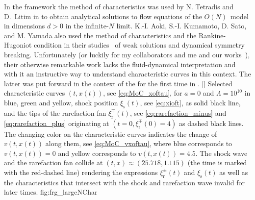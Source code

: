 In the \frg{} framework the method of characteristics was used by N. Tetradis and D.~Litim in  to obtain analytical solutions to \frg{} flow equations of the $O(N)$~model in dimensions $d > 0$ in the infinite-$N$ limit. 
K.-I. Aoki, S.-I. Kumamoto, D. Sato, and M. Yamada also used the method of characteristics and the Rankine-Hugoniot condition in their studies~\cite{Aoki:2014,Aoki:2017rjl} of weak solutions and dynamical symmetry breaking. 
Unfortunately (or luckily for my collaborators and me and our works~\cite{Grossi:2019urj,Grossi:2021ksl,Koenigstein:2021syz,Koenigstein:2021rxj,Steil:partIV,Stoll:2021ori}), their otherwise remarkable work lacks the fluid-dynamical interpretation and with it an instructive way to understand characteristic curves in this context.
The latter was put forward in the context of the \frg{} for the first time in .\bigskip
{}%
	[]%
	{%
{}%
		Selected characteristic curves $(t,x(t))$, see \cref{eq:MoC_xoftau}, for $a=0$ and $\Lambda=10^{10}$ in {blue}, {green} and {yellow}, shock position $\xi_\mathrm{s} ( t )$, see \cref{eq:xioft}, as solid black line, and the tips of the rarefaction fan $\xi_\mathrm{r}^\mp ( t )$, see \cref{eq:rarefaction_minus} and \eqref{eq:rarefaction_plus} originating at $( t = 0, \xi_\mathrm{r}^\mp ( 0 ) = 4 )$ as dashed black lines.
		The changing color on the characteristic curves indicates the change of $v(t,x(t))$ along them, see \cref{eq:MoC_vxoftau}, where {blue} corresponds to $v ( t, x ( t ) ) = 0$ and {yellow} corresponds to $v ( t, x ( t ) ) = 4.5$.
		The shock wave and the rarefaction fan collide at $( t, x ) \approx ( 25.718, 1.115 )$ (the time is marked with the {red-dashed} line) rendering the expressions $\xi_\mathrm{r}^\pm ( t )$ and $\xi_\mathrm{s} ( t )$ as well as the characteristics that intersect with the shock and rarefaction wave invalid for later times.
	}%
	{fig:frg_largeNChar}%

